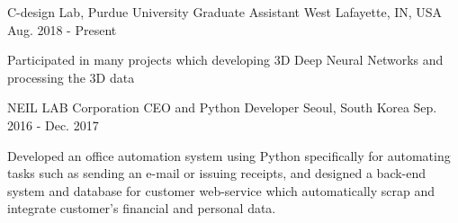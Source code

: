 


\begin{cventries}

\cventry
{C-design Lab, Purdue University} %
{Graduate Assistant} %
{West Lafayette, IN, USA} %
{Aug. 2018 - Present} %
{ %
\begin{cvitems}
\item {Participated in many projects which developing 3D Deep Neural Networks and processing the 3D data}
\end{cvitems}
}

\cventry
{NEIL LAB Corporation} %
{CEO and Python Developer} %
{Seoul, South Korea} %
{Sep. 2016 - Dec. 2017} %
{ %
\begin{cvitems}
\item {Developed an office automation system using Python specifically for automating tasks such as sending an e-mail or issuing receipts, and designed a back-end system and database for customer web-service which automatically scrap and integrate customer's financial and personal data.}
\end{cvitems}
}

\end{cventries}